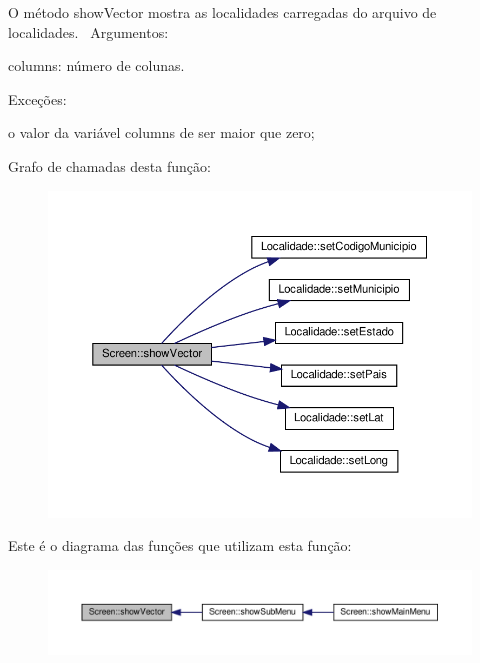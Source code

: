 O método show\+Vector mostra as localidades carregadas do arquivo de localidades.~\newline
Argumentos\+:
\begin{DoxyItemize}
\item columns\+: número de colunas.
\end{DoxyItemize}

Exceções\+:
\begin{DoxyItemize}
\item o valor da variável columns de ser maior que zero;
\end{DoxyItemize}Grafo de chamadas desta função\+:\nopagebreak
\begin{figure}[H]
\begin{center}
\leavevmode
\includegraphics[width=350pt]{classScreen_aca2a46f65496651c74b66e807f7ed421_cgraph}
\end{center}
\end{figure}
Este é o diagrama das funções que utilizam esta função\+:\nopagebreak
\begin{figure}[H]
\begin{center}
\leavevmode
\includegraphics[width=350pt]{classScreen_aca2a46f65496651c74b66e807f7ed421_icgraph}
\end{center}
\end{figure}
\mbox{\label{classScreen_a5fc8c4449368a8507f03bf3243677f1e}} 

